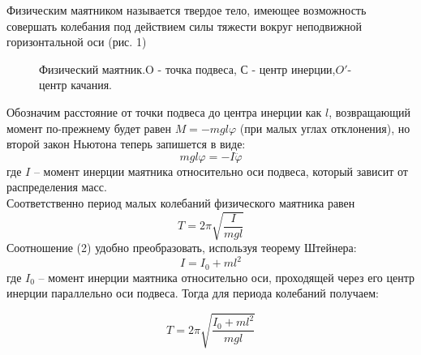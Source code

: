 \documentclass[a4paper]{article}
\begin{document}
Физическим маятником называется твердое тело, имеющее возможность совершать колебания под действием силы тяжести вокруг неподвижной горизонтальной оси (рис. 1)
\begin{figure}[H]
\caption{Физический маятник.O - точка подвеса, С - центр инерции,$O'$- центр качания.}
\end{figure}
Обозначим расстояние от точки подвеса до центра инерции
как $l$, возвращающий момент по-прежнему будет равен
$M=-mgl\varphi$ (при малых углах отклонения), но второй закон Ньютона теперь запишется в виде:
\begin{equation}
mgl\varphi=-I\ddot{\varphi}
\end{equation}
где $I$ – момент инерции маятника относительно оси подвеса,
который зависит от распределения масс.\\
Соответственно период малых колебаний физического маятника равен
\begin{equation}
T=2\pi\sqrt{\dfrac{I}{mgl}}
\end{equation}
Соотношение (2) удобно преобразовать, используя теорему
Штейнера:
\begin{equation}
I=I_0+ml^2
\end{equation}
где $I_0$ – момент инерции маятника относительно оси, проходящей
через его центр инерции параллельно оси подвеса. Тогда для
периода колебаний получаем:

\begin{equation}
T=2\pi\sqrt{\dfrac{I_0+ml^2}{mgl}}
\end{equation}
\end{document}
